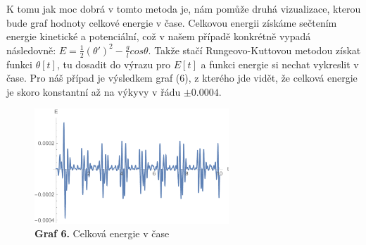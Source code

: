 \documentclass[reqno, a4paper]{amsart}
\begin{document}
		K tomu jak moc dobrá v tomto metoda je, nám pomůže druhá vizualizace, kterou bude graf hodnoty celkové energie v čase. Celkovou energii získáme sečtením energie kinetické a potenciální, což v našem případě konkrétně vypadá následovně: $E = \frac{1}{2} (\theta')^2 - \frac{g}{l} cos \theta$. Takže stačí Rungeovo-Kuttovou metodou získat funkci $\theta[t]$, tu dosadit do výrazu pro $E[t]$ a funkci energie si nechat vykreslit v čase. Pro náš případ je výsledkem graf (6), z kterého jde vidět, že celková energie je skoro konstantní až na výkyvy v řádu $\pm 0.0004$.
		\begin{figure}[h]
			\begin{flushleft}
				\includegraphics[width=0.65\textwidth]{Runge - Kutta, Energie}
				\caption*{\textbf{Graf 6.} Celková energie v čase}
			\end{flushleft}
		\end{figure}
\end{document}
